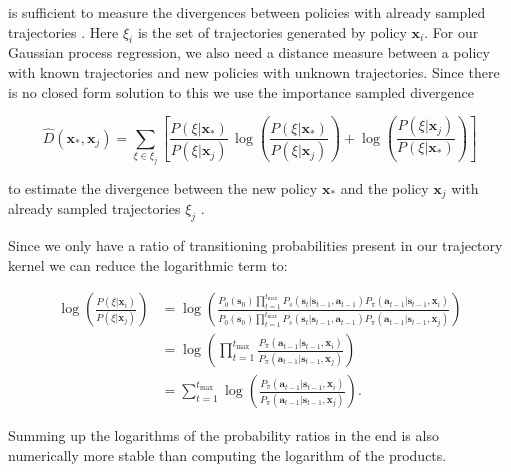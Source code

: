 is sufficient to measure the divergences between policies with already sampled trajectories \cite{wilson2014using}. Here $\xi_i$ is the set of trajectories generated by policy $\mathbf{x}_i$. For our Gaussian process regression, we also need a distance measure between a policy with known trajectories and new policies with unknown trajectories. Since there is no closed form solution to this we use the importance sampled divergence

$$\hat{D}(\mathbf{x}_\mathrm{ * }, \mathbf{x}_{ j }) = \sum _{\xi \in \xi_j} \left[\frac{P(\xi|\mathbf{x}_\mathrm{ * })}{P(\xi|\mathbf{x}_{ j })}\,\log\left(\frac{P(\xi|\mathbf{x}_\mathrm{ * })}{P(\xi|\mathbf{x}_{j})}\right)+\log\left(\frac{P(\xi|\mathbf{x}_{ j })}{P(\xi|\mathbf{x}_\mathrm{ * })}\right)\right] $$

to estimate the divergence between the new policy $\mathbf{x}_\mathrm{ * }$ and the policy $\mathbf{x}_j$ with already sampled trajectories $\xi_j$ \cite{wilson2014using}.

Since we only have a ratio of transitioning probabilities present in our trajectory kernel we can reduce the logarithmic term to:

\begin{align*}
    \log\left(\frac{P(\xi|\mathbf{x}_i)}{P(\xi|\mathbf{x}_j)}\right)
    &= \log\left(\frac{P_{0}(\mathbf{s}_{0}) \prod_{t=1}^{t_\mathrm{max}} P_s(\mathbf{s}_{t}|\mathbf{s}_{t-1},\mathbf{a}_{t-1}) P_{\pi}(\mathbf{a}_{t-1}|\mathbf{s}_{t-1},\mathbf{x}_i)}{P_{0}(\mathbf{s}_{0}) \prod_{t=1}^{t_\mathrm{max}} P_s(\mathbf{s}_{t}|\mathbf{s}_{t-1},\mathbf{a}_{t-1}) P_{\pi}(\mathbf{a}_{t-1}|\mathbf{s}_{t-1},\mathbf{x}_j)}\right)\\
    &= \log\left(\prod_{t=1}^{t_\mathrm{max}}\frac{ P_{\pi}(\mathbf{a}_{t-1}|\mathbf{s}_{t-1},\mathbf{x}_i)}{P_{\pi}(\mathbf{a}_{t-1}|\mathbf{s}_{t-1},\mathbf{x}_j)}\right)\\
    &= \sum_{t=1}^{t_\mathrm{max}} \log \left(\frac{P_{\pi}(\mathbf{a}_{t-1}|\mathbf{s}_{t-1},\mathbf{x}_i)}{P_{\pi}(\mathbf{a}_{t-1}|\mathbf{s}_{t-1},\mathbf{x}_j)}\right).
\end{align*}

Summing up the logarithms of the probability ratios in the end is also numerically more stable than computing the logarithm of the products.
